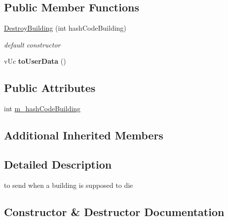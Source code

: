 \subsection*{Public Member Functions}
\begin{DoxyCompactItemize}
\item 
\hyperlink{class_network_1_1_messages_1_1_destroy_building_aa688cf682224a915377a7f689225defb}{Destroy\+Building} (int hash\+Code\+Building)
\begin{DoxyCompactList}\small\item\em default constructor \end{DoxyCompactList}\item 
\mbox{\label{class_network_1_1_messages_1_1_destroy_building_a0cd522d64af181e75a2dd6eced61aef8}} 
v\+Uc {\bfseries to\+User\+Data} ()
\end{DoxyCompactItemize}
\subsection*{Public Attributes}
\begin{DoxyCompactItemize}
\item 
int \hyperlink{class_network_1_1_messages_1_1_destroy_building_a854e9a269861b0fcea6d3ee2d349c899}{m\+\_\+hash\+Code\+Building}
\end{DoxyCompactItemize}
\subsection*{Additional Inherited Members}


\subsection{Detailed Description}
to send when a building is supposed to die 

\subsection{Constructor \& Destructor Documentation}
\mbox{\label{class_network_1_1_messages_1_1_destroy_building_aa688cf682224a915377a7f689225defb}} 
